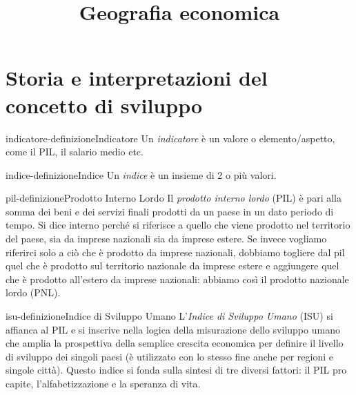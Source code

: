 \documentclass[preview]{standalone}
\begin{document}
\title{Geografia economica}
\genpage

\section{Storia e interpretazioni del concetto di sviluppo}

\begin{snippetdefinition}{indicatore-definizione}{Indicatore}
    Un \textit{indicatore} è un valore o elemento/aspetto, come il PIL, il salario medio etc.
\end{snippetdefinition}

\begin{snippetdefinition}{indice-definizione}{Indice}
    Un \textit{indice} è un insieme di 2 o più valori.
\end{snippetdefinition}


\begin{snippetdefinition}{pil-definizione}{Prodotto Interno Lordo}
    Il \textit{prodotto interno lordo} (PIL) è pari alla somma dei beni e dei servizi finali
    prodotti da un paese in un dato periodo di tempo. Si dice interno perché si riferisce
    a quello che viene prodotto nel territorio del paese, sia da imprese nazionali sia
    da imprese estere. Se invece vogliamo riferirci solo a ciò che è prodotto da
    imprese nazionali, dobbiamo togliere dal pil quel che è prodotto sul territorio
    nazionale da imprese estere e aggiungere quel che è prodotto all'estero da
    imprese nazionali: abbiamo così il prodotto nazionale lordo (PNL).
\end{snippetdefinition}


\begin{snippetdefinition}{isu-definizione}{Indice di Sviluppo Umano}
    L'\textit{Indice di Sviluppo Umano} (ISU) si affianca al PIL e si inscrive
    nella logica della misurazione dello sviluppo umano che amplia la prospettiva
    della semplice crescita economica per definire il livello di sviluppo dei singoli
    paesi (è utilizzato con lo stesso fine anche per regioni e singole città).
    Questo indice si fonda sulla sintesi di tre diversi fattori: il PIL pro capite,
    l'alfabetizzazione e la speranza di vita.
\end{snippetdefinition}
\end{document}
